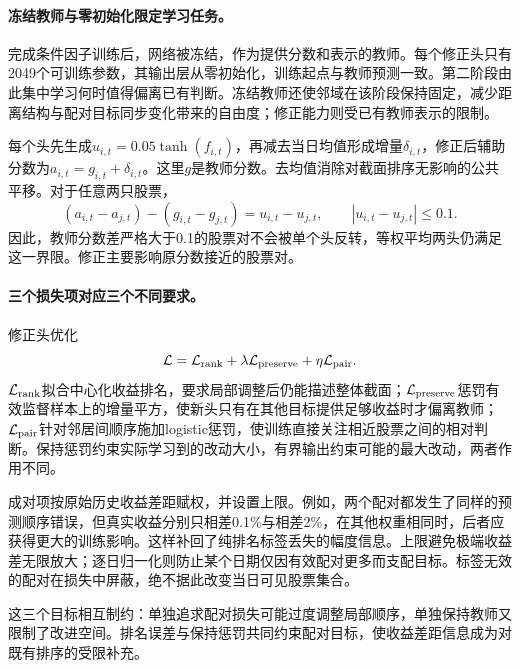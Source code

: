 \documentclass[UTF8,11pt,a4paper,fontset=fandol]{ctexart}
\begin{document}
\paragraph{冻结教师与零初始化限定学习任务。}
完成条件因子训练后，网络被冻结，作为提供分数和表示的教师。每个修正头只有2049个可训练参数，其输出层从零初始化，训练起点与教师预测一致。第二阶段由此集中学习何时值得偏离已有判断。冻结教师还使邻域在该阶段保持固定，减少距离结构与配对目标同步变化带来的自由度；修正能力则受已有教师表示的限制。

每个头先生成$u_{i,t}=0.05\tanh(f_{i,t})$，再减去当日均值形成增量$\delta_{i,t}$，修正后辅助分数为$a_{i,t}=g_{i,t}+\delta_{i,t}$。这里$g$是教师分数。去均值消除对截面排序无影响的公共平移。对于任意两只股票，
\begin{equation}
 (a_{i,t}-a_{j,t})-(g_{i,t}-g_{j,t})=u_{i,t}-u_{j,t},\qquad
 |u_{i,t}-u_{j,t}|\leq0.1.
 \label{eq:pairbound}
\end{equation}
因此，教师分数差严格大于0.1的股票对不会被单个头反转，等权平均两头仍满足这一界限。修正主要影响原分数接近的股票对。

\paragraph{三个损失项对应三个不同要求。}
修正头优化
\begin{equation}
 \mathcal L=\mathcal L_{\rm rank}
           +\lambda\mathcal L_{\rm preserve}
           +\eta\mathcal L_{\rm pair}.
 \label{eq:loss}
\end{equation}
$\mathcal L_{\rm rank}$拟合中心化收益排名，要求局部调整后仍能描述整体截面；$\mathcal L_{\rm preserve}$惩罚有效监督样本上的增量平方，使新头只有在其他目标提供足够收益时才偏离教师；$\mathcal L_{\rm pair}$针对邻居间顺序施加logistic惩罚，使训练直接关注相近股票之间的相对判断。保持惩罚约束实际学习到的改动大小，有界输出约束可能的最大改动，两者作用不同。

成对项按原始历史收益差距赋权，并设置上限。例如，两个配对都发生了同样的预测顺序错误，但真实收益分别只相差0.1\%与相差2\%，在其他权重相同时，后者应获得更大的训练影响。这样补回了纯排名标签丢失的幅度信息。上限避免极端收益差无限放大；逐日归一化则防止某个日期仅因有效配对更多而支配目标。标签无效的配对在损失中屏蔽，绝不据此改变当日可见股票集合。

这三个目标相互制约：单独追求配对损失可能过度调整局部顺序，单独保持教师又限制了改进空间。排名误差与保持惩罚共同约束配对目标，使收益差距信息成为对既有排序的受限补充。
\end{document}
